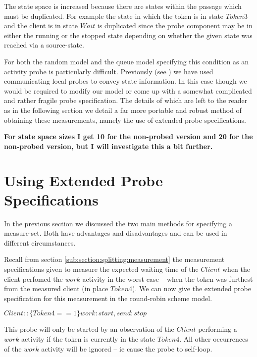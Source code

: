 \documentclass[times, 10pt,twocolumn]{article}
\newcommand{\adcComment}[1]{\textbf{#1}}
\newcommand{\showprobe}[1]{$#1$}
\newcommand{\quoteActivity}[1]{$#1$}
\newcommand{\quoteProcess}[1]{$#1$}
\begin{document}
The state space is increased because there are states within the
passage which must be duplicated. For example the state in which the
token is in state \quoteProcess{Token3} and the client is in state
\quoteProcess{Wait} is duplicated since the probe component may be
in either the running or the stopped state depending on whether the
given state was reached via a source-state.

For both the random model and the queue model specifying this condition
as an activity probe is particularly difficult.
Previously (see \cite{LocationAwareStochasticProbes})
we have used communicating local probes to convey state information.
In this case though we would be required to modify our model or
come up with a somewhat complicated and rather fragile probe specification.
The details of which are left to the reader as in the following section
we detail a far more portable and robust method of obtaining these
measurements, namely the use of extended probe specifications.


\adcComment{For state space sizes I get 10 for the non-probed version
and 20 for the non-probed version, but I will investigate this a bit
further.}


\section{Using Extended Probe Specifications}

In the previous section we discussed the two main methods for
specifying a measure-set. Both have advantages and disadvantages
and can be used in different circumstances.

Recall from section
\ref{sub:section:splitting:measurement}
the measurement specifications given to measure the expected
waiting time of the \quoteProcess{Client} when the client perfomed
the \quoteActivity{work} activity in the worst case -- when the
token was furthest from the measured client (in place \quoteProcess{Token4}).
We can now give the extended probe specification for this measurement
in the round-robin scheme model.

\showprobe{ Client:: \{Token4 == 1\}work:start, send:stop }

\noindent
This probe will only be started by an observation of the
\quoteProcess{Client} performing a \quoteActivity{work}
activity if the token is currently in the state \quoteProcess{Token4}.
All other occurrences of the \quoteActivity{work} activity will be ignored
-- ie cause the probe to self-loop.
\end{document}
